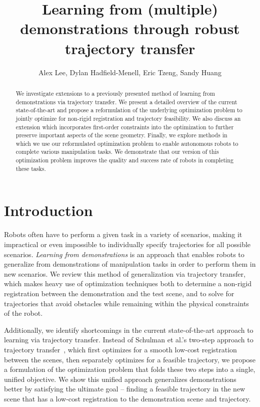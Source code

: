 \documentclass{article}
\title{Learning from (multiple) demonstrations through robust trajectory transfer}
\author{Alex Lee, Dylan Hadfield-Menell, Eric Tzeng, Sandy Huang}
\date{}
\begin{document}
\maketitle

\begin{abstract}
We investigate extensions to a previously presented method of learning from demonstrations via trajectory transfer. We present a detailed overview of the current state-of-the-art and propose a reformulation of the underlying optimization problem to jointly optimize for non-rigid registration and trajectory feasibility. We also discuss an extension which incorporates first-order constraints into the optimization to further preserve important aspects of the scene geometry. Finally, we explore methods in which we use our reformulated optimization problem to enable autonomous robots to complete various manipulation tasks. We demonstrate that our version of this optimization problem improves the quality and success rate of robots in completing these tasks.
\end{abstract}

\section{Introduction}

Robots often have to perform a given task in a variety of scenarios, making it impractical or even impossible to individually specify trajectories for all possible scenarios. \emph{Learning from demonstrations} is an approach that enables robots to generalize from demonstrations of manipulation tasks in order to perform them in new scenarios. We review this method of generalization via trajectory transfer, which makes heavy use of optimization techniques both to determine a non-rigid registration between the demonstration and the test scene, and to solve for trajectories that avoid obstacles while remaining within the physical constraints of the robot.

Additionally, we identify shortcomings in the current state-of-the-art approach to learning via trajectory transfer. Instead of Schulman et al.'s two-step approach to trajectory transfer~\cite{Schulmanetal_ISRR2013}, which first optimizes for a smooth low-cost registration between the scenes, then separately optimizes for a feasible trajectory, we propose a formulation of the optimization problem that folds these two steps into a single, unified objective. We show this unified approach generalizes demonstrations better by satisfying the ultimate goal -- finding a feasible trajectory in the new scene that has a low-cost registration to the demonstration scene and trajectory.
\end{document}

